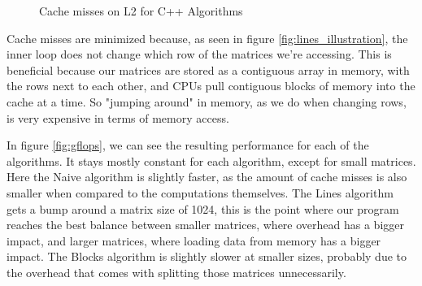 \documentclass[sigconf,balance,nonacm]{acmart}
\begin{document}
\begin{figure}[ht!]
    \caption{Cache misses on L2 for C++ Algorithms}
    \label{fig:l2cache}
\end{figure}

Cache misses are minimized because, as seen in figure \ref{fig:lines_illustration}, the inner loop does not change which row of the matrices we're accessing.
This is beneficial because our matrices are stored as a contiguous array in memory, with the rows next to each other, and CPUs pull contiguous blocks of memory into the cache at a time.
So "jumping around" in memory, as we do when changing rows, is very expensive in terms of memory access.

In figure \ref{fig:gflops}, we can see the resulting performance for each of the algorithms.
It stays mostly constant for each algorithm, except for small matrices.
Here the Naive algorithm is slightly faster, as the amount of cache misses is also smaller when compared to the computations themselves.
The Lines algorithm gets a bump around a matrix size of 1024, this is the point where our program reaches the best balance between smaller matrices, where overhead has a bigger impact, and larger matrices, where loading data from memory has a bigger impact.
The Blocks algorithm is slightly slower at smaller sizes, probably due to the overhead that comes with splitting those matrices unnecessarily.
\end{document}
